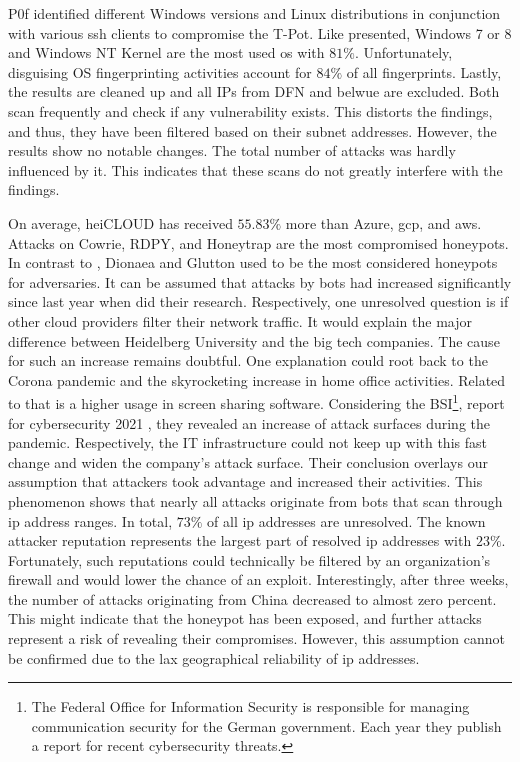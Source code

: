 P0f identified different Windows versions and Linux distributions in conjunction with various \ac{ssh} clients to compromise the T-Pot.
Like \citet{Kelly2021} presented, Windows 7 or 8 and Windows NT Kernel are the most used \ac{os} with $81\%$.
Unfortunately, disguising OS fingerprinting activities account for $84\%$ of all fingerprints.
Lastly, the results are cleaned up and all IPs from DFN and \acs{belwue} are excluded.
Both scan frequently and check if any vulnerability exists.
This distorts the findings, and thus, they have been filtered based on their subnet addresses.
However, the results show no notable changes.
The total number of attacks was hardly influenced by it.
This indicates that these scans do not greatly interfere with the findings.

On average, heiCLOUD has received $55.83\%$ more than Azure, \ac{gcp}, and \ac{aws}.
Attacks on Cowrie, RDPY, and Honeytrap are the most compromised honeypots.
In contrast to \citet{Kelly2021}, Dionaea and Glutton used to be the most considered honeypots for adversaries.
It can be assumed that attacks by bots had increased significantly since last year when \citet{Kelly2021} did their research.
Respectively, one unresolved question is if other cloud providers filter their network traffic.
It would explain the major difference between Heidelberg University and the big tech companies.
The cause for such an increase remains doubtful.
One explanation could root back to the Corona pandemic and the skyrocketing increase in home office activities.
Related to that is a higher usage in screen sharing software.
Considering the BSI\footnote{The Federal Office for Information Security is responsible for managing communication security for the German government.
Each year they publish a report for recent cybersecurity threats.}, report for cybersecurity 2021 \cite{bsi2021}, they revealed an increase of attack surfaces during the pandemic.
Respectively, the IT infrastructure could not keep up with this fast change and widen the company's attack surface.
Their conclusion overlays our assumption that attackers took advantage and increased their activities.
This phenomenon shows that nearly all attacks originate from bots that scan through \ac{ip} address ranges.
In total, $73\%$ of all \ac{ip} addresses are unresolved.
The known attacker reputation represents the largest part of resolved \ac{ip} addresses with $23\%$.
Fortunately, such reputations could technically be filtered by an organization's firewall and would lower the chance of an exploit.
Interestingly, after three weeks, the number of attacks originating from China decreased to almost zero percent.
This might indicate that the honeypot has been exposed, and further attacks represent a risk of revealing their compromises.
However, this assumption cannot be confirmed due to the lax geographical reliability of \ac{ip} addresses.

